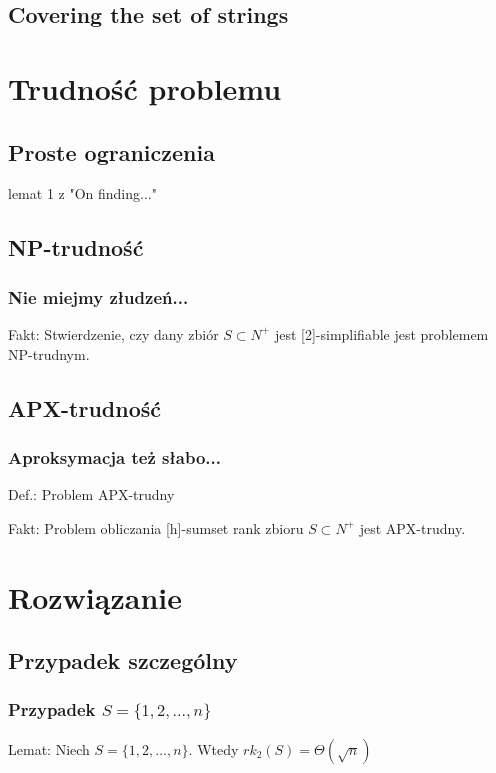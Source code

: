 \documentclass{beamer}
\begin{document}
	\subsection{Covering the set of strings}
		\begin{frame}
		\end{frame}
		
\section{Trudność problemu}
	\subsection{Proste ograniczenia}
		\begin{frame}
			lemat 1 z "On finding..."
		\end{frame}
		
	\subsection{NP-trudność}
		\begin{frame} \frametitle{Nie miejmy złudzeń...}
			Fakt: Stwierdzenie, czy dany zbiór $ S \subset N^{+} $ jest [2]-simplifiable jest problemem NP-trudnym.
		\end{frame}
		
	\subsection{APX-trudność}
		\begin{frame} \frametitle{Aproksymacja też słabo...}
			Def.: Problem APX-trudny
		
			Fakt: Problem obliczania [h]-sumset rank zbioru $ S \subset N^{+} $ jest APX-trudny.
		\end{frame}
		
\section{Rozwiązanie}
	\subsection{Przypadek szczególny}
		\begin{frame} \frametitle{Przypadek $ S = \lbrace 1,2,...,n \rbrace $}
			Lemat: Niech $ S = \lbrace 1,2,...,n \rbrace $. Wtedy $ rk_{2}(S) = \Theta(\sqrt{n}) $
		\end{frame}
		
\end{document}
